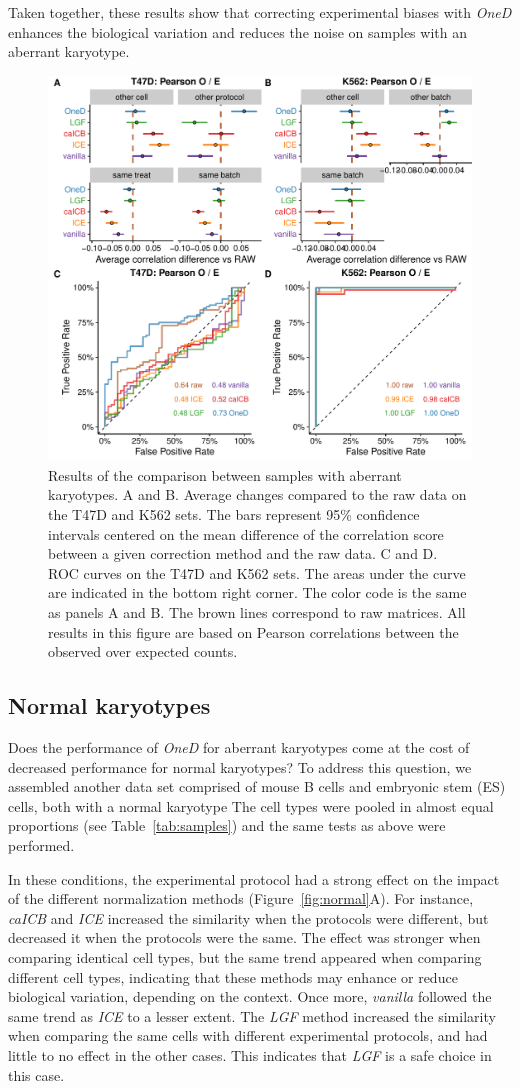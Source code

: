 \documentclass{bioinfo}
\begin{document}
Taken together, these results show that correcting experimental biases
with \textit{OneD} enhances the biological variation and reduces the noise
on samples with an aberrant karyotype.


\begin{figure}
\centerline{\includegraphics[width=.50\textwidth]
  {img/correlation_aberrant_figure3.pdf}}
\caption{
Results of the comparison between samples with aberrant karyotypes. A and
B. Average changes compared to the raw data on the T47D and K562 sets. The
bars represent 95\% confidence intervals centered on the mean difference
of the correlation score between a given correction method and the raw
data. C and D. ROC curves on the T47D and K562 sets.  The areas under the
curve are indicated in the bottom right corner. The color code is the same
as panels A and B. The brown lines correspond to raw matrices. All results
in this figure are based on Pearson correlations between the observed over
expected counts.}
\label{fig:aberrant}
\end{figure}



\subsection{Normal karyotypes}

Does the performance of \textit{OneD} for aberrant karyotypes come at the
cost of decreased performance for normal karyotypes? To address this
question, we assembled another data set comprised of mouse B cells and
embryonic stem (ES) cells, both with a normal karyotype The cell types
were pooled in almost equal proportions (see Table~\ref{tab:samples}) and
the same tests as above were performed.

In these conditions, the experimental protocol had a strong effect on the
impact of the different normalization methods (Figure~\ref{fig:normal}A).
For instance, \textit{caICB} and \textit{ICE} increased the similarity
when the protocols were different, but decreased it when the protocols
were the same. The effect was stronger when comparing identical cell
types, but the same trend appeared when comparing different cell types,
indicating that these methods may enhance or reduce biological variation,
depending on the context. Once more, \textit{vanilla} followed the same
trend as \textit{ICE} to a lesser extent. The \textit{LGF} method
increased the similarity when comparing the same cells with different
experimental protocols, and had little to no effect in the other cases.
This indicates that \textit{LGF} is a safe choice in this case.
\end{document}
